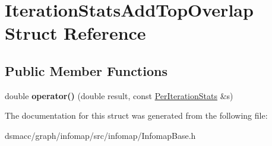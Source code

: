 \hypertarget{structIterationStatsAddTopOverlap}{}\section{Iteration\+Stats\+Add\+Top\+Overlap Struct Reference}
\label{structIterationStatsAddTopOverlap}
\subsection*{Public Member Functions}
\begin{DoxyCompactItemize}
\item 
\mbox{\label{structIterationStatsAddTopOverlap_acb4e3abe74e65d106c87ea60f949b76d}} 
double {\bfseries operator()} (double result, const \mbox{\hyperlink{structPerIterationStats}{Per\+Iteration\+Stats}} \&s)
\end{DoxyCompactItemize}


The documentation for this struct was generated from the following file\+:\begin{DoxyCompactItemize}
\item 
dsmacc/graph/infomap/src/infomap/Infomap\+Base.\+h\end{DoxyCompactItemize}
